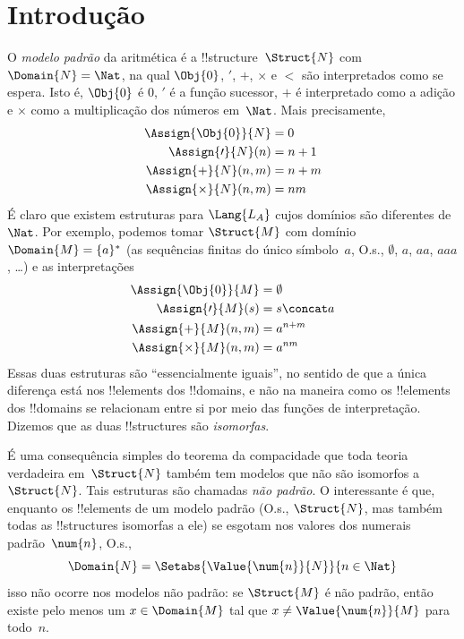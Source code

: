 \documentclass[../../../include/open-logic-section]{subfiles}
\begin{document}
\section{Introdução}

O \emph{modelo padrão} da aritmética é a
!!{structure}~$\Struct{N}$ com $\Domain{N} = \Nat$, na qual
$\Obj{0}$, $\prime$, $+$, $\times$ e $<$ são interpretados como se
espera. Isto é, $\Obj{0}$ é $0$, $\prime$ é a função sucessor,
$+$ é interpretado como a adição e $\times$ como a multiplicação
dos números em~$\Nat$. Mais precisamente,
\begin{align*}
  \Assign{\Obj{0}}{N} & = 0\\
  \Assign{\prime}{N}(n) & = n + 1\\
  \Assign{+}{N}(n, m) & = n + m\\
  \Assign{\times}{N}(n, m) & = nm
\end{align*}
É claro que existem estruturas para $\Lang{L_A}$ cujos domínios são
diferentes de~$\Nat$. Por exemplo, podemos tomar $\Struct{M}$ com domínio
$\Domain{M} = \{a\}^*$ (as sequências finitas do único
símbolo~$a$, O.s.\@, $\emptyset$, $a$, $aa$, $aaa$, \dots) e as
interpretações
\begin{align*}
  \Assign{\Obj{0}}{M} & = \emptyset\\
  \Assign{\prime}{M}(s) & = s \concat a\\
  \Assign{+}{M}(n, m) & = a^{n + m}\\
  \Assign{\times}{M}(n, m) & = a^{nm}
\end{align*}
Essas duas estruturas são ``essencialmente iguais'', no sentido de que
a única diferença está nos !!{element}s dos !!{domain}s, e não na maneira
como os !!{element}s dos !!{domain}s se relacionam entre si por meio
das funções de interpretação. Dizemos que as duas !!{structure}s são
\emph{isomorfas}.

É uma consequência simples do teorema da compacidade que toda teoria
verdadeira em~$\Struct{N}$ também tem modelos que não são isomorfos
a~$\Struct{N}$.  Tais estruturas são chamadas \emph{não padrão}.  O
interessante é que, enquanto os !!{element}s de um modelo padrão (O.s.\@, $\Struct{N}$, mas também todas as !!{structure}s isomorfas a ele) se
esgotam nos valores dos numerais padrão~$\num{n}$, O.s.\@,
\[
\Domain{N} = \Setabs{\Value{\num{n}}{N}}{n \in \Nat}
\]
isso não ocorre nos modelos não padrão: se $\Struct{M}$ é não padrão,
então existe pelo menos um $x \in \Domain{M}$ tal que
$x \neq \Value{\num{n}}{M}$ para todo~$n$.
\end{document}
